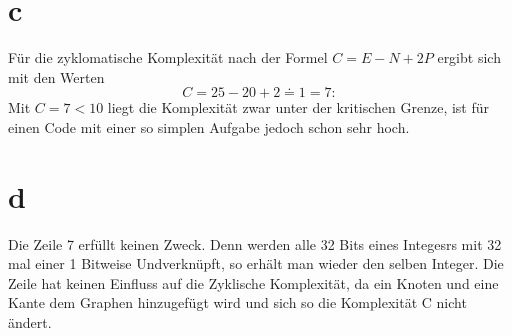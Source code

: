\section*{c}
Für die zyklomatische Komplexität nach der Formel $ C=E-N+2P$ ergibt sich mit den Werten
\begin{equation}
	C= 25-20+2 \doteq 1 = 7:
\end{equation}
Mit $C=7<10$ liegt die Komplexität zwar unter der kritischen Grenze, ist für einen Code mit einer so simplen Aufgabe jedoch schon sehr hoch. 



%

\section*{d}
Die Zeile 7 erfüllt keinen Zweck. Denn werden alle 32 Bits eines Integesrs mit 32 mal einer 1 Bitweise Undverknüpft, so erhält man wieder den selben Integer.
Die Zeile hat keinen Einfluss auf die Zyklische Komplexität, da ein Knoten und eine Kante dem Graphen hinzugefügt wird und sich so die Komplexität C nicht ändert.